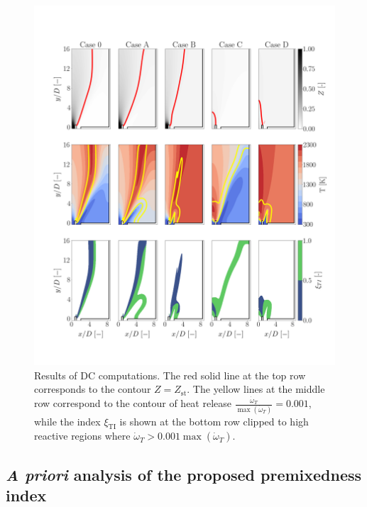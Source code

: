 \documentclass[preprint,12pt,authoryear]{elsarticle}
\begin{document}
{\begin{figure}[h!]
    \centering
	\includegraphics[scale=0.25]{./figures/FR_maps_Z_T_zetaTI}
    \vspace{-0.5in}
	\caption{Results of DC computations. The red solid line at the top row corresponds to the contour $Z = Z_\mathrm{st}$. The yellow lines at the middle row correspond to the contour of heat release $ \frac{\dot{\omega}_T }{\max \left( \dot{\omega}_T \right) } = 0.001$, while the index $\xi_\mathrm{TI}$ is shown at the bottom row clipped to high reactive regions where $ \dot{\omega}_T >  0.001 \max \left( \dot{\omega}_T \right)$.}
	\label{fig:FR_maps_T_TI}
\end{figure}

\clearpage

\subsection{\textsl{A priori} analysis of the proposed premixedness index}

}
\end{document}
